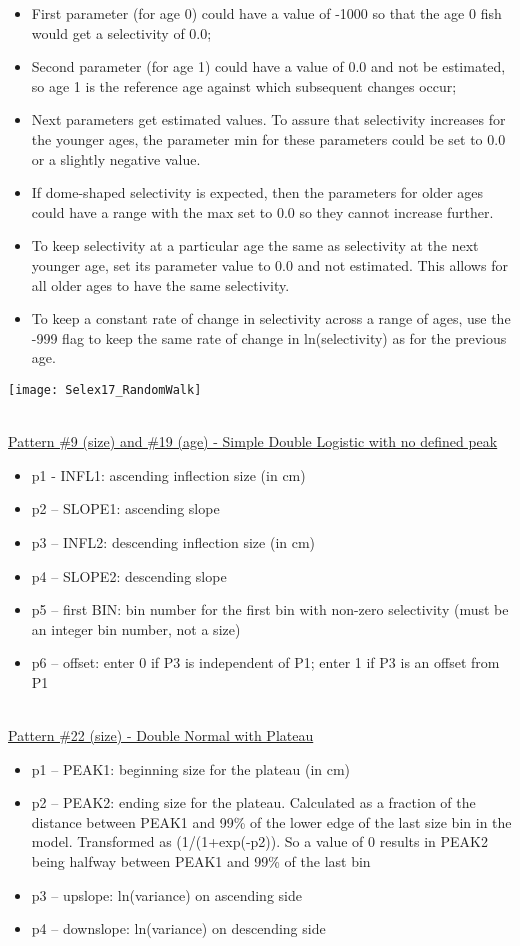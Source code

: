 \begin{itemize}
	\item First parameter (for age 0) could have a value of -1000 so that the age 0 fish would get a selectivity of 0.0;
	\item 	Second parameter (for age 1) could have a value of 0.0 and not be estimated, so age 1 is the reference age against which subsequent changes occur;
	\item 	Next parameters get estimated values.  To assure that selectivity increases for the younger ages, the parameter min for these parameters could be set to 0.0 or a slightly negative value.
	\item If dome-shaped selectivity is expected, then the parameters for older ages could have a range with the max set to 0.0 so they cannot increase further.
	\item To keep selectivity at a particular age the same as selectivity at the next younger age, set its parameter value to 0.0 and not estimated.  This allows for all older ages to have the same selectivity.
	\item 	To keep a constant rate of change in selectivity across a range of ages, use the -999 flag to keep the same rate of change in ln(selectivity) as for the previous age.
\end{itemize}
\begin{center}
	\texttt{[image: Selex17\_RandomWalk]}
\end{center}
\hfil
\\
\underline{Pattern \#9 (size) and \#19 (age) - Simple Double Logistic with no defined peak}
\begin{itemize}
	\item p1 - INFL1:  ascending inflection size (in cm)
	\item p2 – SLOPE1:  ascending slope
	\item p3 – INFL2:  descending inflection size (in cm)
	\item p4 – SLOPE2:  descending slope
	\item p5 – first BIN: bin number for the first bin with non-zero selectivity (must be an integer bin number, not a size)
	\item p6 – offset:  enter 0 if P3 is independent of P1; enter 1 if P3 is an offset from P1
\end{itemize}
\hfil
\\
\underline{Pattern \#22 (size) - Double Normal with Plateau}
\begin{itemize}
	\item p1 – PEAK1:  beginning size for the plateau (in cm)
	\item p2 – PEAK2:  ending size for the plateau.  Calculated as a fraction of the distance between PEAK1 and 99\% of the lower edge of the last size bin in the model.  Transformed as (1/(1+exp(-p2)).   So a value of 0 results in PEAK2 being halfway between PEAK1 and 99\% of the last bin
	\item p3 – upslope:  ln(variance) on ascending side
	\item p4 – downslope:  ln(variance) on descending side
\end{itemize}

